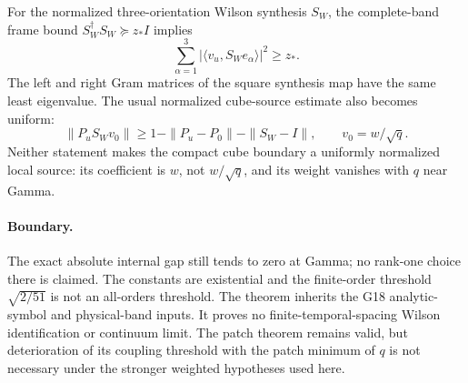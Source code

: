 For the normalized three-orientation Wilson synthesis $S_W$, the
complete-band frame bound $S_W^\dagger S_W\succeq z_*I$ implies
\[
 \sum_{\alpha=1}^3|\langle v_u,S_We_\alpha\rangle|^2\ge z_*.
\]
The left and right Gram matrices of the square synthesis map have the same
least eigenvalue. The usual normalized cube-source estimate also becomes
uniform:
\[
 \|P_uS_Wv_0\|\ge1-\|P_u-P_0\|-\|S_W-I\|,\qquad v_0=w/\sqrt q.
\]
Neither statement makes the compact cube boundary a uniformly normalized
local source: its coefficient is $w$, not $w/\sqrt q$, and its weight
vanishes with $q$ near Gamma.

\paragraph{Boundary.}
The exact absolute internal gap still tends to zero at Gamma; no
rank-one choice there is claimed. The constants are existential and the
finite-order threshold $\sqrt{2/51}$ is not an all-orders threshold.
The theorem inherits the G18 analytic-symbol and physical-band inputs.
It proves no finite-temporal-spacing Wilson identification or continuum
limit. The patch theorem remains valid, but deterioration of its coupling
threshold with the patch minimum of $q$ is not necessary under the stronger
weighted hypotheses used here.
